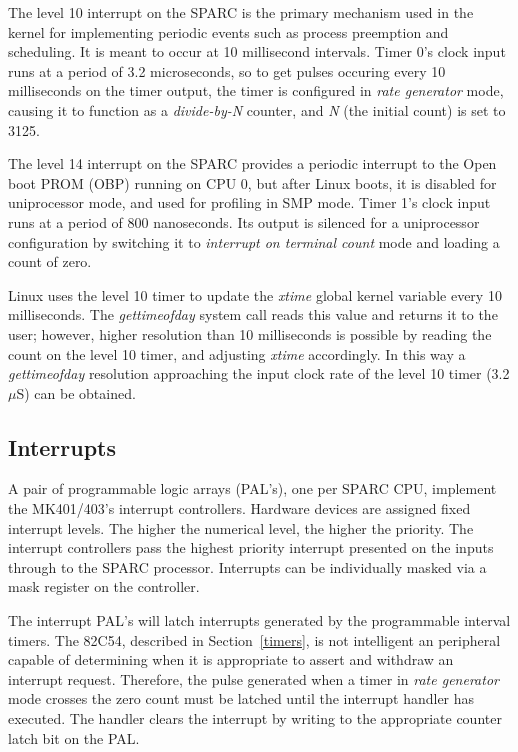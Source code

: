 \documentclass{article}
\begin{document}
  The level 10 interrupt on the SPARC is the primary mechanism used in the 
kernel for implementing periodic events such as process preemption and 
scheduling.  It is meant to occur at 10 millisecond intervals.
Timer 0's clock input runs at a period of 3.2 microseconds, so to get 
pulses occuring every 10 milliseconds on the timer output, the timer is 
configured in {\em rate generator} mode, causing it to function as a 
{\em divide-by-N} counter, and {\em N} (the initial count) is set to 3125.

  The level 14 interrupt on the SPARC provides a periodic interrupt
to the Open boot PROM (OBP) running on CPU 0, but after Linux boots, 
it is disabled for uniprocessor mode, and used for profiling in 
SMP mode.  Timer 1's clock input runs at a period of 800 nanoseconds.  
Its output is silenced for a uniprocessor configuration by switching it to
{\em interrupt on terminal count} mode and loading a count of zero.

  Linux uses the level 10 timer to update the {\em xtime} global kernel
variable every 10 milliseconds.  The {\em gettimeofday} system call reads
this value and returns it to the user; however, higher resolution than
10 milliseconds is possible by reading the count on the level 10 timer,
and adjusting {\em xtime} accordingly.  In this way a {\em gettimeofday}
resolution approaching the input clock rate of the level 10 timer (3.2
$\mu$S) can be obtained.

\subsection{Interrupts}

  A pair of programmable logic arrays (PAL's), one per SPARC CPU, 
implement the MK401/403's interrupt controllers.  Hardware devices 
are assigned fixed interrupt levels.
The higher the numerical level, the higher the priority.  The interrupt 
controllers pass the highest priority interrupt presented on the inputs
through to the SPARC processor.  Interrupts can be individually masked
via a mask register on the controller.  

  The interrupt PAL's will latch interrupts generated by the programmable 
interval timers.  The 82C54, described in Section~\ref{timers}, 
is not intelligent an peripheral capable of determining when it is appropriate
to assert and withdraw an interrupt request.  Therefore, the pulse generated
when a timer in {\em rate generator} mode crosses the zero count must be
latched until the interrupt handler has executed.  The handler clears the
interrupt by writing to the appropriate counter latch bit on the PAL.
\end{document}
